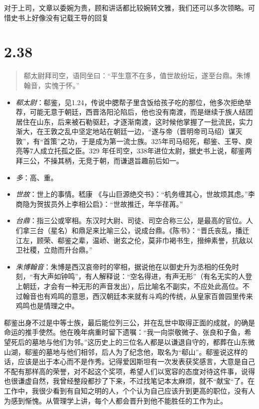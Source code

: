 \documentclass[]{book}
\providecommand{\tightlist}{%
  \setlength{\itemsep}{0pt}\setlength{\parskip}{0pt}}
\begin{document}
对于上司，文章以委婉为贵，顾和讲话都比较婉转文雅，我们还可以多次领略。可惜史书上好像没有记载王导的回复

\section{2.38}\label{section-84}

\begin{quote}
郗太尉拜司空，语同坐曰：``平生意不在多，值世故纷坛，遂至台鼎。朱博翰音，实愧于怀。''
\end{quote}

\begin{itemize}
\tightlist
\item
  \emph{郗太尉}：郗鉴，见1.24，传说中腮帮子里含饭给孩子吃的那位，他多次拒绝举荐，可能无意于朝廷，西晋洛阳沦陷后，他也没有南渡，而是继续于族人结团居住在山东，后来被石勒驱赶，才逐渐南渡，这时候他掌握了一批流民，实力渐大，在王敦之乱中坚定地站在朝廷一边，``遂与帝（晋明帝司马绍）谋灭敦''，有``首策''之功，于是成为第一流士族。325年司马绍死，郗鉴、王导、庾亮等7人成立托孤之臣。329
  年任司空，338年进位太尉，据史书上说，郗鉴两拜三公，不操其柄，无竞于朝，而谦退旨趣前后如一。
\item
  \emph{多}：高、重。
\item
  \emph{世故}：世上的事情。嵇康
  《与山巨源绝交书》：``机务缠其心，世故烦其虑。''李商隐为贺拔员外上李相公启》：``世故推迁，年华荏苒。''
\item
  \emph{台鼎}：指三公或宰相。东汉时大尉、司徒、司空合称三公，是最高的官位。人们拿三台（星名）和鼎足来比喻三公，说成台鼎。《陈书》：``晋氏丧乱，播迁江左，顾荣、郗鉴之辈，温峤、谢玄之伦，莫非巾褐书生，搢绅素誉，抗敌以卫社稷，立勋而升台鼎。''
\item
  \emph{朱博翰音}：朱博是西汉哀帝时的宰相，据说他在以御史升为丞相的任免时刻，``有大声如钟鸣''，有人解释说：``空名得进，有声无形''（有名无实的人登上朝廷，才会有一种无形的声音发出），后比喻名不副实，不应处此高位。不过翰音也有鸡鸣的意思，西汉朝廷本来就有斗鸡的传统，从皇家百兽园里传来鸡鸣也是情理之中。
\end{itemize}

郗鉴出身不过是中等士族，最后能位列三公，并在乱世中取得正面的成就，的确是命运的推手使然。他在晚年病重时留下遗嘱：``我一向崇敬微子、张良和子鱼，希望死后的墓地与他们为邻。''这历史上的三位名人都是以谦退自守的，都葬在山东微山湖，郗鉴的墓地与他们相邻，后人为了纪念他，取名为``郗山''。郗鉴说这样的话，应该是出于本心而不是作秀。记得爱因斯坦有一次发表获奖感言，大意是自己不配有那样高的荣誉，对不起这个奖项，希望人们以宽容的态度对待这件事，说得也很谦虚自然，我曾经整段都抄了下来，不过找笔记本太麻烦，就不``献宝``了。在工作中，我很少看到有自知之明的人，个个认为自己应该升到更高的职位，没有人为感到惭愧。从管理学上讲，每个人都会晋升到他不能胜任的工作为止。
\end{document}
